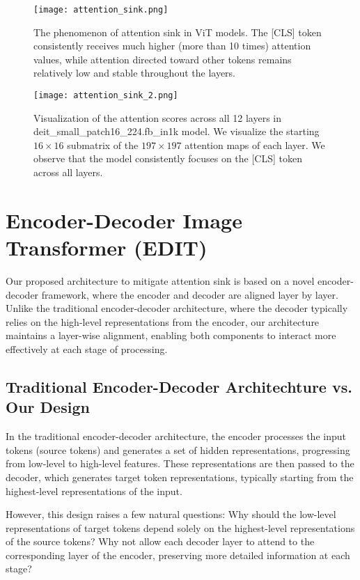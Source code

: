 \documentclass[anon,12pt]{colt2024} %
\begin{document}
\begin{figure}[h!]
  \centering
  \texttt{[image: attention\_sink.png]}
  \caption{The phenomenon of attention sink in ViT models. The [CLS] token consistently receives much higher (more than 10 times) attention values, while attention directed toward other tokens remains relatively low and stable throughout the layers. }\label{fig:attention-sink-1}
\end{figure}
  
\begin{figure}[h!]
  \centering
  \texttt{[image: attention\_sink\_2.png]}
  \caption{Visualization of the attention scores across all 12 layers in deit\_small\_patch16\_224.fb\_in1k model. We visualize the starting $16\times16$ submatrix of the $197\times197$ attention maps of each layer. We observe that the model consistently focuses on the [CLS] token across all layers.}\label{fig:attention-sink-2}
\end{figure}
  

\section{Encoder-Decoder Image Transformer (EDIT)}

Our proposed architecture to mitigate attention sink is based on a novel encoder-decoder framework, where the encoder and decoder are aligned layer by layer.
Unlike the traditional encoder-decoder architecture, where the decoder typically relies on the high-level representations from the encoder, our architecture maintains a layer-wise alignment, enabling both components to interact more effectively at each stage of processing.

\subsection{Traditional Encoder-Decoder Architechture vs. Our Design}
In the traditional encoder-decoder architecture, the encoder processes the input tokens (source tokens) and generates a set of hidden representations, progressing from low-level to high-level features.
These representations are then passed to the decoder, which generates target token representations, typically starting from the highest-level representations of the input.

However, this design raises a few natural questions: Why should the low-level representations of target tokens depend solely on the highest-level representations of the source tokens? Why not allow each decoder layer to attend to the corresponding layer of the encoder, preserving more detailed information at each stage?
\end{document}
